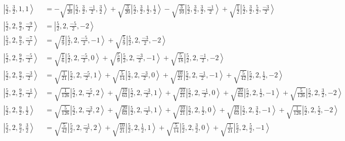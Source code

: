\documentclass{report}
\newcommand{\ket}[1]{\left| #1 \right>} %
\begin{document}
\begin{align*}
\ket{ \frac{5}{2} ,  \frac{3}{2} ,  1 ,  1  } &=  - \sqrt{  \frac{1}{20}  } \ket{ \frac{5}{2} ,  \frac{3}{2} ,  \frac{-1}{2} ,  \frac{3}{2}  } + \sqrt{  \frac{3}{20}  } \ket{ \frac{5}{2} ,  \frac{3}{2} ,  \frac{1}{2} ,  \frac{1}{2}  } - \sqrt{  \frac{3}{10}  } \ket{ \frac{5}{2} ,  \frac{3}{2} ,  \frac{3}{2} ,  \frac{-1}{2}  } + \sqrt{  \frac{1}{2}  } \ket{ \frac{5}{2} ,  \frac{3}{2} ,  \frac{5}{2} ,  \frac{-3}{2}  } \\
\ket{ \frac{5}{2} ,  2 ,  \frac{9}{2} ,  \frac{-9}{2}  } &=  \ket{ \frac{5}{2} ,  2 ,  \frac{-5}{2} ,  -2  } \\
\ket{ \frac{5}{2} ,  2 ,  \frac{9}{2} ,  \frac{-7}{2}  } &=  \sqrt{  \frac{4}{9}  } \ket{ \frac{5}{2} ,  2 ,  \frac{-5}{2} ,  -1  } + \sqrt{  \frac{5}{9}  } \ket{ \frac{5}{2} ,  2 ,  \frac{-3}{2} ,  -2  } \\
\ket{ \frac{5}{2} ,  2 ,  \frac{9}{2} ,  \frac{-5}{2}  } &=  \sqrt{  \frac{1}{6}  } \ket{ \frac{5}{2} ,  2 ,  \frac{-5}{2} ,  0  } + \sqrt{  \frac{5}{9}  } \ket{ \frac{5}{2} ,  2 ,  \frac{-3}{2} ,  -1  } + \sqrt{  \frac{5}{18}  } \ket{ \frac{5}{2} ,  2 ,  \frac{-1}{2} ,  -2  } \\
\ket{ \frac{5}{2} ,  2 ,  \frac{9}{2} ,  \frac{-3}{2}  } &=  \sqrt{  \frac{1}{21}  } \ket{ \frac{5}{2} ,  2 ,  \frac{-5}{2} ,  1  } + \sqrt{  \frac{5}{14}  } \ket{ \frac{5}{2} ,  2 ,  \frac{-3}{2} ,  0  } + \sqrt{  \frac{10}{21}  } \ket{ \frac{5}{2} ,  2 ,  \frac{-1}{2} ,  -1  } + \sqrt{  \frac{5}{42}  } \ket{ \frac{5}{2} ,  2 ,  \frac{1}{2} ,  -2  } \\
\ket{ \frac{5}{2} ,  2 ,  \frac{9}{2} ,  \frac{-1}{2}  } &=  \sqrt{  \frac{1}{126}  } \ket{ \frac{5}{2} ,  2 ,  \frac{-5}{2} ,  2  } + \sqrt{  \frac{10}{63}  } \ket{ \frac{5}{2} ,  2 ,  \frac{-3}{2} ,  1  } + \sqrt{  \frac{10}{21}  } \ket{ \frac{5}{2} ,  2 ,  \frac{-1}{2} ,  0  } + \sqrt{  \frac{20}{63}  } \ket{ \frac{5}{2} ,  2 ,  \frac{1}{2} ,  -1  } + \sqrt{  \frac{5}{126}  } \ket{ \frac{5}{2} ,  2 ,  \frac{3}{2} ,  -2  } \\
\ket{ \frac{5}{2} ,  2 ,  \frac{9}{2} ,  \frac{1}{2}  } &=  \sqrt{  \frac{5}{126}  } \ket{ \frac{5}{2} ,  2 ,  \frac{-3}{2} ,  2  } + \sqrt{  \frac{20}{63}  } \ket{ \frac{5}{2} ,  2 ,  \frac{-1}{2} ,  1  } + \sqrt{  \frac{10}{21}  } \ket{ \frac{5}{2} ,  2 ,  \frac{1}{2} ,  0  } + \sqrt{  \frac{10}{63}  } \ket{ \frac{5}{2} ,  2 ,  \frac{3}{2} ,  -1  } + \sqrt{  \frac{1}{126}  } \ket{ \frac{5}{2} ,  2 ,  \frac{5}{2} ,  -2  } \\
\ket{ \frac{5}{2} ,  2 ,  \frac{9}{2} ,  \frac{3}{2}  } &=  \sqrt{  \frac{5}{42}  } \ket{ \frac{5}{2} ,  2 ,  \frac{-1}{2} ,  2  } + \sqrt{  \frac{10}{21}  } \ket{ \frac{5}{2} ,  2 ,  \frac{1}{2} ,  1  } + \sqrt{  \frac{5}{14}  } \ket{ \frac{5}{2} ,  2 ,  \frac{3}{2} ,  0  } + \sqrt{  \frac{1}{21}  } \ket{ \frac{5}{2} ,  2 ,  \frac{5}{2} ,  -1  } \\

\end{align*}
\end{document}
